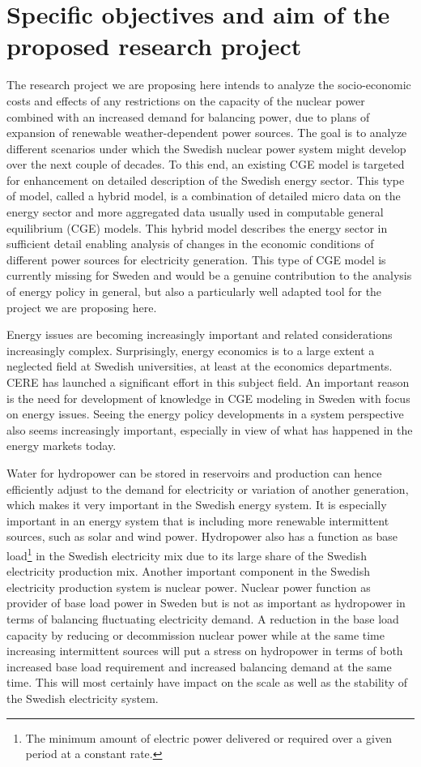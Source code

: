 \section{Specific objectives and aim of the proposed research project}
The research project we are proposing here intends to analyze the socio-economic costs and effects of any restrictions on the capacity of the nuclear power combined with an increased demand for balancing power, due to plans of expansion of renewable weather-dependent power sources. The goal is to analyze different scenarios under which the Swedish nuclear power system might develop over the next couple of decades. To this end, an existing CGE model is targeted for enhancement on detailed description of the Swedish energy sector. This type of model, called a hybrid model, is a combination of detailed micro data on the energy sector and more aggregated data usually used in computable general equilibrium (CGE) models. This hybrid model describes the energy sector in sufficient detail enabling analysis of changes in the economic conditions of different power sources for electricity generation. This type of CGE model is currently missing for Sweden and would be a genuine contribution to the analysis of energy policy in general, but also a particularly well adapted tool for the project we are proposing here.

Energy issues are becoming increasingly important and related considerations increasingly complex. Surprisingly, energy economics is to a large extent a neglected field at Swedish universities, at least at the economics departments. CERE has launched a significant effort in this subject field. An important reason is the need for development of knowledge in CGE modeling in Sweden with focus on energy issues. Seeing the energy policy developments in a system perspective also seems increasingly important, especially in view of what has happened in the energy markets today.

Water for hydropower can be stored in reservoirs and production can hence efficiently adjust to the demand for electricity or variation of another generation, which makes it very important in the Swedish energy system. It is especially important in an energy system that is including more renewable intermittent sources, such as solar and wind power. Hydropower also has a function as base load\footnote{The minimum amount of electric power delivered or required over a given period at a constant rate.} in the Swedish electricity mix due to its large share of the Swedish electricity production mix. Another important component in the Swedish electricity production system is nuclear power. Nuclear power function as provider of base load power in Sweden but is not as important as hydropower in terms of balancing fluctuating electricity demand. A reduction in the base load capacity by reducing or decommission nuclear power while at the same time increasing intermittent sources will put a stress on hydropower in terms of both increased base load requirement and increased balancing demand at the same time. This will most certainly have impact on the scale as well as the stability of the Swedish electricity system.

